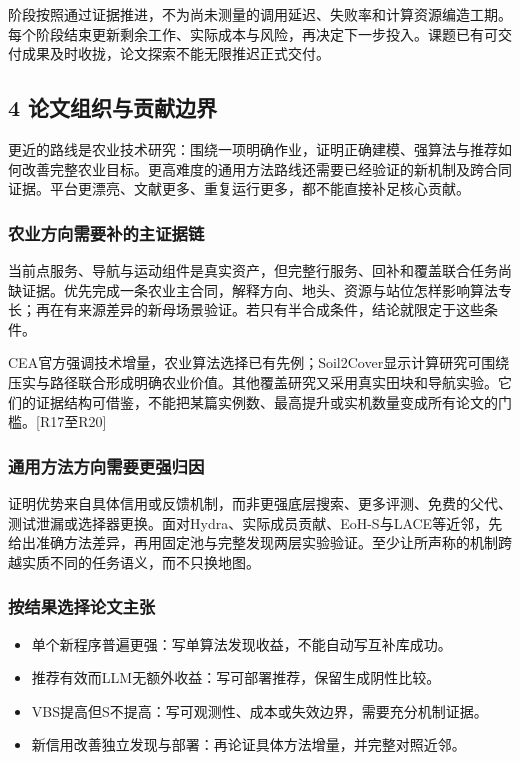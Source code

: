 \documentclass[11pt,a4paper]{article}
\newcommand{\bodytext}[1]{#1\par}
\begin{document}
\bodytext{阶段按照通过证据推进，不为尚未测量的调用延迟、失败率和计算资源编造工期。每个阶段结束更新剩余工作、实际成本与风险，再决定下一步投入。课题已有可交付成果及时收拢，论文探索不能无限推迟正式交付。}
\subsection{4  论文组织与贡献边界}
\bodytext{更近的路线是农业技术研究：围绕一项明确作业，证明正确建模、强算法与推荐如何改善完整农业目标。更高难度的通用方法路线还需要已经验证的新机制及跨合同证据。平台更漂亮、文献更多、重复运行更多，都不能直接补足核心贡献。}
\subsubsection{农业方向需要补的主证据链}
\bodytext{当前点服务、导航与运动组件是真实资产，但完整行服务、回补和覆盖联合任务尚缺证据。优先完成一条农业主合同，解释方向、地头、资源与站位怎样影响算法专长；再在有来源差异的新母场景验证。若只有半合成条件，结论就限定于这些条件。}
\bodytext{CEA官方强调技术增量，农业算法选择已有先例；Soil2Cover显示计算研究可围绕压实与路径联合形成明确农业价值。其他覆盖研究又采用真实田块和导航实验。它们的证据结构可借鉴，不能把某篇实例数、最高提升或实机数量变成所有论文的门槛。[R17至R20]}
\subsubsection{通用方法方向需要更强归因}
\bodytext{证明优势来自具体信用或反馈机制，而非更强底层搜索、更多评测、免费的父代、测试泄漏或选择器更换。面对Hydra、实际成员贡献、EoH-S与LACE等近邻，先给出准确方法差异，再用固定池与完整发现两层实验验证。至少让所声称的机制跨越实质不同的任务语义，而不只换地图。}
\subsubsection{按结果选择论文主张}
\begin{itemize}
\item 单个新程序普遍更强：写单算法发现收益，不能自动写互补库成功。
\item 推荐有效而LLM无额外收益：写可部署推荐，保留生成阴性比较。
\item VBS提高但S不提高：写可观测性、成本或失效边界，需要充分机制证据。
\item 新信用改善独立发现与部署：再论证具体方法增量，并完整对照近邻。
\end{itemize}
\end{document}
